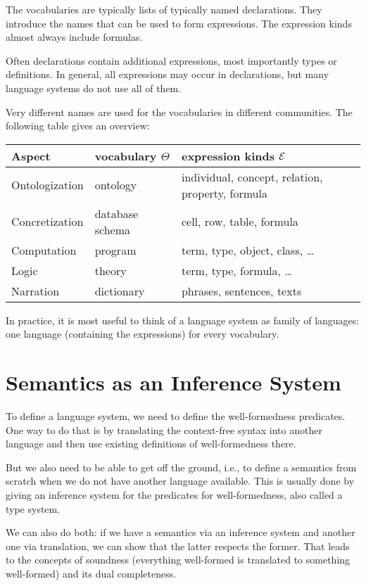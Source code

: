 The vocabularies are typically lists of typically named declarations.
They introduce the names that can be used to form expressions.
The expression kinds almost always include formulas.

Often declarations contain additional expressions, most importantly types or definitions.
In general, all expressions may occur in declarations, but many language systems do not use all of them.

Very different names are used for the vocabularies in different communities.
The following table gives an overview:

\begin{center}
\begin{tabular}{l|ll}
Aspect & vocabulary $\Theta$ & expression kinds $\mathcal{E}$ \\
\hline
Ontologization  & ontology & individual, concept, relation, property, formula \\
Concretization & database schema & cell, row, table, formula \\
Computation & program & term, type, object, class, \ldots \\
Logic & theory & term, type, formula, \ldots \\
Narration & dictionary & phrases, sentences, texts \\
\end{tabular}
\end{center}

In practice, it is most useful to think of a language system as family of languages: one language (containing the expressions) for every vocabulary.

\section{Semantics as an Inference System}

To define a language system, we need to define the well-formedness predicates.
One way to do that is by translating the context-free syntax into another language and then use existing definitions of well-formedness there.

But we also need to be able to get off the ground, i.e., to define a semantics from scratch when we do not have another language available.
This is usually done by giving an inference system for the predicates for well-formedness, also called a type system.

We can also do both: if we have a semantics via an inference system and another one via translation, we can show that the latter respects the former.
That leads to the concepts of soundness (everything well-formed is translated to something well-formed) and its dual completeness.


